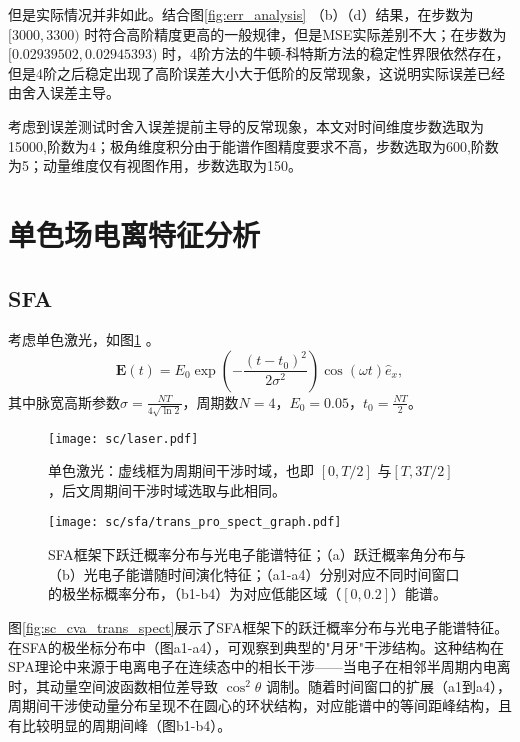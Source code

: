  但是实际情况并非如此。结合图\ref{fig:err_analysis} （b）（d）结果，在步数为$[3000, 3300)$ 时符合高阶精度更高的一般规律，但是MSE实际差别不大；在步数为$[0.02939502, 0.02945393)$ 时，4阶方法的牛顿-科特斯方法的稳定性界限依然存在，但是4阶之后稳定出现了高阶误差大小大于低阶的反常现象，这说明实际误差已经由舍入误差主导。

考虑到误差测试时舍入误差提前主导的反常现象，本文对时间维度步数选取为15000,阶数为4；极角维度积分由于能谱作图精度要求不高，步数选取为600,阶数为5；动量维度仅有视图作用，步数选取为150。

%
\section{单色场电离特征分析}
\subsection{SFA}
考虑单色激光，如图\ref{fig:sc_laser} 。
\begin{equation}
	\mathbf{E}(t) = E_0 \exp\left(-\frac{(t - t_0)^2}{2\sigma^2}\right) \cos(\omega t) \hat e_x,
	\label{eq:sc_laser}
\end{equation}
其中脉宽高斯参数$\sigma = \frac{NT}{4\sqrt{\ln{2}}}$，周期数$N = 4$，$E_0 = 0.05$，$t_0 = \frac{NT}{2}$。

\begin{figure}[!htbp]  %
	\centering
	\texttt{[image: sc/laser.pdf]}
	\caption{单色激光：虚线框为周期间干涉时域，也即 $[0, T/2]$ 与$ [T, 3T/2]$ ，后文周期间干涉时域选取与此相同。}
	\label{fig:sc_laser}
\end{figure}

\begin{figure}[!htbp]  %
	\centering
	\texttt{[image: sc/sfa/trans\_pro\_spect\_graph.pdf]}
	\caption{SFA框架下跃迁概率分布与光电子能谱特征；（a）跃迁概率角分布与（b）光电子能谱随时间演化特征；（a1-a4）分别对应不同时间窗口的极坐标概率分布，（b1-b4）为对应低能区域（$[0, 0.2]$）能谱。}
	\label{fig:sc_sfa_trans_spect}
\end{figure}

图\ref{fig:sc_cva_trans_spect}展示了SFA框架下的跃迁概率分布与光电子能谱特征。在SFA的极坐标分布中（图a1-a4），可观察到典型的"月牙"干涉结构。这种结构在SPA理论中来源于电离电子在连续态中的相长干涉——当电子在相邻半周期内电离时，其动量空间波函数相位差导致  $\cos^2\theta$ 调制。随着时间窗口的扩展（a1到a4），周期间干涉使动量分布呈现不在圆心的环状结构，对应能谱中的等间距峰结构，且有比较明显的周期间峰（图b1-b4）。

